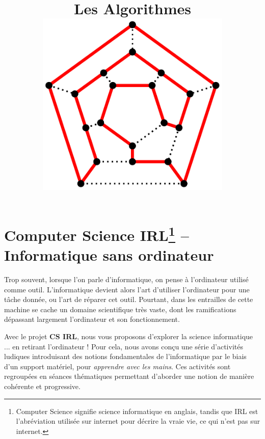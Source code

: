 \documentclass[a5paper,pagesize,DIV=14]{scrbook}
\title{Les Algorithmes \\ \includegraphics[width=0.7\textwidth]{img/Hamiltonian_path.pdf} \label{img:hamiltonian}}
\date{}
\begin{document}
\maketitle

\chapter*{Computer Science IRL\footnote{Computer Science signifie science informatique en anglais, tandis que IRL est l'abréviation utilisée sur internet pour décrire la vraie vie, ce qui n'est pas sur internet.} -- Informatique sans ordinateur}


Trop souvent, lorsque l'on parle d'informatique, on pense à l'ordinateur utilisé comme outil. L'informatique devient alors l'art d'utiliser l'ordinateur pour une tâche donnée, ou l'art de réparer cet outil. Pourtant, dans les entrailles de cette machine se cache un domaine scientifique très vaste, dont les ramifications dépassant largement l'ordinateur et son fonctionnement.

Avec le projet \textbf{CS IRL}, nous vous proposons d'explorer la science informatique ... en retirant l'ordinateur ! Pour cela, nous avons conçu une série d'activités ludiques introduisant des notions fondamentales de l'informatique par le biais d'un support matériel, pour \textit{apprendre avec les mains}. Ces activités sont regroupées en séances thématiques permettant d'aborder une notion de manière cohérente et progressive.
\end{document}
